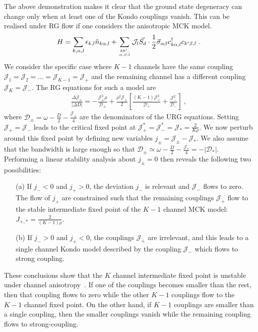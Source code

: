 \documentclass{iopart}
\begin{document}
The above demonstration makes it clear that the ground state degeneracy can change only when at least one of the Kondo couplings vanish. This can be realised under RG flow if one considers the anisotropic MCK model.
\begin{eqnarray}
	H = \sum_{k,\alpha,l}\epsilon_{k,l} \hat n_{k\alpha,l} + \sum_{kk^\prime,\atop{\alpha,\beta,l}}{\mathcal{J}}_l \vec{S_d}\cdot\frac{1}{2}\vec{\sigma}_{\alpha\beta}c_{k\alpha,l}^\dagger c_{k^\prime\beta, l}~.
\end{eqnarray}
We consider the specific case where \(K-1\) channels have the same coupling \({\mathcal{J}}_1 = {\mathcal{J}}_2 = ... = {\mathcal{J}}_{K-1} = {\mathcal{J}}_+\) and the remaining channel has a different coupling \({\mathcal{J}}_K = {\mathcal{J}}_-\). The RG equations for such a model are
\begin{eqnarray}
	\frac{\Delta {\mathcal{J}}_\pm}{|\Delta D|} = -\frac{{\mathcal{J}}_\pm^2 \rho}{\mathcal{D}_\pm} + \frac{\rho^2 {\mathcal{J}}_\pm}{2}\left[\frac{(K-1){\mathcal{J}}_+^2}{\mathcal{D}_+} + \frac{{\mathcal{J}}_-^2}{\mathcal{D}_-}\right]~,
\end{eqnarray}
where \(\mathcal{D}_\pm = \omega - \frac{D}{2} - \frac{{\mathcal{J}}_\pm}{4}\) are the denominators of the URG equations.
Setting \({\mathcal{J}}_+ = {\mathcal{J}}_-\) leads to the critical fixed point at \({\mathcal{J}}_+^* = {\mathcal{J}}_-^* = {\mathcal{J}}_* = \frac{2}{K \rho}\). We now perturb around this fixed point by defining new variables \(j_\pm = {\mathcal{J}}_\pm - {\mathcal{J}}_*\). We also assume that the bandwidth is large enough so that \(\mathcal{D}_\pm \simeq \omega - \frac{D}{2} - \frac{{\mathcal{J}}_*}{4} = -|\mathcal{D}_*|\). Performing a linear stability analysis about \(j_\pm=0\) then reveals the following two possibilities:
\begin{itemize}
	\item[(a)] If \(j_-<0\) and \(j_+>0\), the deviation \(j_-\) is relevant and \(\mathcal{J}_-\) flows to zero. The flow of \(j_+\) are constrained such that the remaining couplings \(\mathcal{J}_+\) flow to the stable intermediate fixed point of the \(K-1\) channel MCK model: \(J_{+,*} = \frac{2}{(K-1)\rho}\).
	\item[(b)] If \(j_- > 0\) and \(j_+<0\), the couplings \(\mathcal{J}_+\) are irrelevant, and this leads to a single channel Kondo model described by the coupling \(\mathcal{J}_-\) which flows to strong coupling.
\end{itemize}

These conclusions show that the \(K\) channel intermediate fixed point is unstable under channel anisotropy~\cite{Noz_blandin_1980,andrei_jerez_1995,affleck_pang_cox_1992,zarand_2000}. If one of the couplings becomes smaller than the rest, then that coupling flows to zero while the other \(K-1\) couplings flow to the \(K-1\) channel fixed point. On the other hand, if \(K-1\) couplings are smaller than a single coupling, then the smaller couplings vanish while the remaining coupling flows to strong-coupling.
\end{document}
